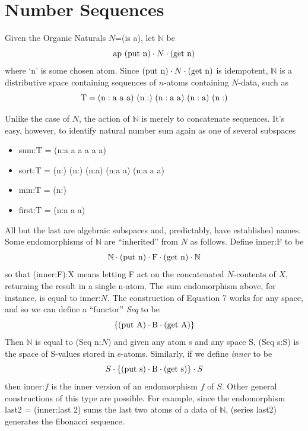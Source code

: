 \documentclass[11pt]{article}
\begin{document}
\section{Number Sequences}

      Given the Organic Naturals $N$=(is a), let $\mathbb{N}$ be 
\begin{equation}
{{\rm ap}\ ({\rm put\ {\rm n}})\cdot N \cdot ({\rm get\ {\rm n}})}
\end{equation}
where `n' is some chosen atom.  Since $({\rm put\ n})\cdot N \cdot ({\rm get\ n})$ is idempotent, ${\mathbb N}$ is a distributive space containing 
sequences of $n$-atoms containing $N$-data, such as 
\begin{equation} 
{\rm T = (n:a\ a\ a)\ (n:)\ (n:a\ a)\ (n:a)\ (n:)}
\end{equation} 

Unlike the case of $N$, the action of ${\mathbb N}$ is merely to concatenate sequences.  It's easy, however, to identify 
natural number sum again as one of several subspaces 
\begin{itemize}
\item sum:T = (n:a a a a a a)
\item sort:T = (n:) (n:) (n:a) (n:a a) (n:a a a)
\item min:T = (n:)
\item first:T = (n:a a a)
\end{itemize} 
All but the last are algebraic subspaces and, predictably, have established names.  
Some endomorphisms of ${\mathbb N}$ are ``inherited'' from $N$ as follows.  Define inner:F to be 
\begin{equation}
{\mathbb N}\cdot({\rm put\ n})\cdot {\rm F}\cdot({\rm get\ n})\cdot{\mathbb N}
\end{equation}
so that (inner:F):X means letting F act on the concatenated $N$-contents of $X$, returning the result in a single n-atom.  The sum endomorphism 
above, for instance, is equal to inner:$N$.  The construction of Equation 7 works for any space, and so we can define a ``functor'' {\it Seq} to be 
\begin{equation}
\{({\rm put}\ {\rm A})\cdot {\rm B} \cdot ({\rm get}\ {\rm A})\}
\end{equation}
Then {$\mathbb N$} is equal to (Seq n:$N$) and given any atom s and any space S, (Seq s:S) is the space of S-values stored in s-atoms.  
Similarly, if we define {\it inner} to be  
\begin{equation}
S\cdot\{({\rm put\ s})\cdot{\rm B}\cdot({\rm get\ s})\}\cdot S
\end{equation}
then inner:$f$ is the inner version of an endomorphism $f$ of $S$.  Other general constructions of this type are possible.  For example, 
since the endomorphism last2 = (inner:last 2) sums the last two atoms of a data of ${\mathbb N}$, (series last2) generates the fibonacci sequence. 
\end{document}
